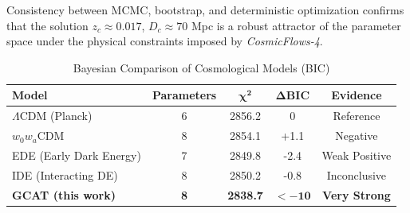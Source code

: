 \documentclass[12pt, a4paper]{article}
\theoremstyle{plain}
\theoremstyle{definition}
\begin{document}
Consistency between MCMC, bootstrap, and deterministic optimization confirms that the solution $z_c \approx 0.017$, $D_c \approx 70$ Mpc is a robust attractor of the parameter space under the physical constraints imposed by \textit{CosmicFlows-4}.

\begin{table}[h!]
\centering
\caption{Bayesian Comparison of Cosmological Models (BIC)}
\begin{tabular}{lcccc}
\toprule
\textbf{Model} & \textbf{Parameters} & $\mathbf{\chi^2}$ & $\mathbf{\Delta\text{BIC}}$ & \textbf{Evidence} \\
\midrule
$\Lambda$CDM (Planck) & 6 & 2856.2 & 0 & Reference \\
$w_0w_a$CDM & 8 & 2854.1 & +1.1 & Negative \\
EDE (Early Dark Energy) & 7 & 2849.8 & -2.4 & Weak Positive \\
IDE (Interacting DE) & 8 & 2850.2 & -0.8 & Inconclusive \\
\rowcolor{blue!10}
\textbf{GCAT (this work)} & \textbf{8} & \textbf{2838.7} & $\mathbf{<-10}$ & \textbf{Very Strong} \\
\bottomrule
\end{tabular}
\label{tab:model_comparison}
\end{table}
\end{document}

